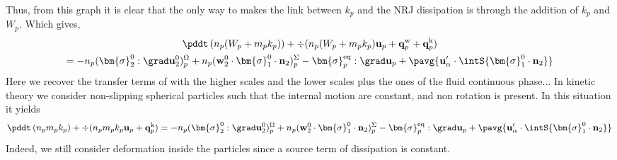 Thus, from this graph it is clear that the only way to makes the link between $k_p$ and the NRJ dissipation is through the addition of $k_p$ and $W_p$. Which gives, 
\begin{multline*}
    \pddt \left(n_p (W_p+m_p k_p)\right)
    + \div 
    (n_p (W_p+m_p k_p)
    \textbf{u}_p 
    +  \textbf{q}_p^\text{w}
    +  \textbf{q}_p^\text{k}
    )\\
    = 
    - n_p (\bm{\sigma}_2^0 : \grad\textbf{u}_2^0)^\Omega_p
    + n_p (\textbf{w}_2^0 \cdot \bm{\sigma}_1^0 \cdot  \textbf{n}_2)^\Sigma_p
    - \bm{\sigma}_p^\text{eq}  :\grad \textbf{u}_p
    + \pavg{\textbf{u}_\alpha'\cdot\intS{\bm{\sigma}_1^0 \cdot \textbf{n}_2}}
\end{multline*}
Here we recover the transfer terms of with the higher scales and the lower scales plus the ones of the fluid continuous phase...
In kinetic theory we consider non-slipping spherical particles such that the internal motion are constant, and non rotation is present.
In this situation it yields 
\begin{equation}
    \pddt \left(n_p m_p k_p\right)
    + \div 
    (n_p m_p k_p
    \textbf{u}_p 
    +  \textbf{q}_p^\text{k}
    )
    = 
    - n_p (\bm{\sigma}_2^0 : \grad\textbf{u}_2^0)^\Omega_p
    + n_p (\textbf{w}_2^0 \cdot \bm{\sigma}_1^0 \cdot  \textbf{n}_2)^\Sigma_p
    - \bm{\sigma}_p^\text{eq}  :\grad \textbf{u}_p
    + \pavg{\textbf{u}_\alpha'\cdot\intS{\bm{\sigma}_1^0 \cdot \textbf{n}_2}}
\end{equation}
Indeed, we still consider deformation inside the particles since a source term of dissipation is constant. 

